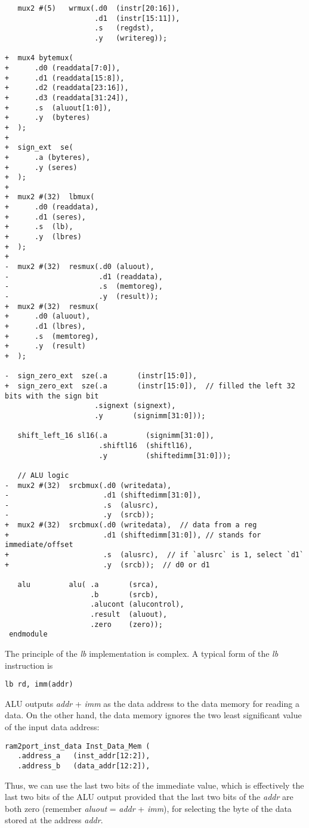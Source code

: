 \begin{verbatim}
   mux2 #(5)   wrmux(.d0  (instr[20:16]), 
                     .d1  (instr[15:11]), 
                     .s   (regdst), 
                     .y   (writereg));
 
+  mux4 bytemux(
+      .d0 (readdata[7:0]), 
+      .d1 (readdata[15:8]), 
+      .d2 (readdata[23:16]), 
+      .d3 (readdata[31:24]), 
+      .s  (aluout[1:0]), 
+      .y  (byteres)
+  );
+
+  sign_ext  se(
+      .a (byteres),
+      .y (seres)
+  );
+
+  mux2 #(32)  lbmux(
+      .d0 (readdata), 
+      .d1 (seres), 
+      .s  (lb), 
+      .y  (lbres)
+  );
+
-  mux2 #(32)  resmux(.d0 (aluout), 
-                     .d1 (readdata), 
-                     .s  (memtoreg), 
-                     .y  (result));
+  mux2 #(32)  resmux(
+      .d0 (aluout), 
+      .d1 (lbres), 
+      .s  (memtoreg), 
+      .y  (result)
+  );
 
-  sign_zero_ext  sze(.a       (instr[15:0]), 
+  sign_zero_ext  sze(.a       (instr[15:0]),  // filled the left 32 bits with the sign bit
                     .signext (signext),
                     .y       (signimm[31:0]));
 
   shift_left_16 sl16(.a         (signimm[31:0]), 
                      .shiftl16  (shiftl16),
                      .y         (shiftedimm[31:0]));
 
   // ALU logic
-  mux2 #(32)  srcbmux(.d0 (writedata), 
-                      .d1 (shiftedimm[31:0]), 
-                      .s  (alusrc), 
-                      .y  (srcb));
+  mux2 #(32)  srcbmux(.d0 (writedata),  // data from a reg
+                      .d1 (shiftedimm[31:0]), // stands for immediate/offset
+                      .s  (alusrc),  // if `alusrc` is 1, select `d1`
+                      .y  (srcb));  // d0 or d1
 
   alu         alu( .a       (srca), 
                    .b       (srcb), 
                    .alucont (alucontrol),
                    .result  (aluout), 
                    .zero    (zero));
 endmodule
\end{verbatim}

The principle of the \textit{lb} implementation is complex. A typical form of the \textit{lb} instruction is
\begin{verbatim}
lb rd, imm(addr)
\end{verbatim}
ALU outputs \textit{addr} + \textit{imm} as the data address to the data memory for reading a data. On the other hand, the data memory ignores the two least significant value of the input data address:
\begin{verbatim}
ram2port_inst_data Inst_Data_Mem (
   .address_a   (inst_addr[12:2]),
   .address_b   (data_addr[12:2]),
\end{verbatim}
Thus, we can use the last two bits of the immediate value, which is effectively the last two bits of the ALU output provided that the last two bits of the \textit{addr} are both zero (remember \textit{aluout} = \textit{addr} + \textit{imm}), for selecting the byte of the data stored at the address \textit{addr}.

